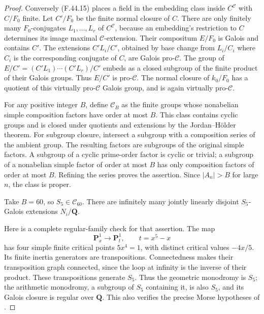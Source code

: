 \begin{proof}
Conversely \textup{(F.44.15)} places a field in the embedding class inside \(C^{\mathcal C}\) with \(C/F_0\) finite. Let \(C'/F_0\) be the finite normal closure of \(C\). There are only finitely many \(F_0\)-conjugates \(L_1,\ldots,L_r\) of \(C^{\mathcal C}\), because an embedding's restriction to \(C\) determines its image maximal \(\mathcal C\)-extension. Their compositum \(E/F_0\) is Galois and contains \(C'\). The extensions \(C'L_i/C'\), obtained by base change from \(L_i/C_i\) where \(C_i\) is the corresponding conjugate of \(C\), are Galois pro-\(\mathcal C\). The group of \(E/C'=(C'L_1)\cdots(C'L_r)/C'\) embeds as a closed subgroup of the finite product of their Galois groups. Thus \(E/C'\) is pro-\(\mathcal C\). The normal closure of \(k_0/F_0\) has a quotient of this virtually pro-\(\mathcal C\) Galois group, and is again virtually pro-\(\mathcal C\).


For any positive integer \(B\), define \(\mathcal C_B\) as the finite groups whose nonabelian simple composition factors have order at most \(B\). This class contains cyclic groups and is closed under quotients and extensions by the Jordan–Hölder theorem. For subgroup closure, intersect a subgroup with a composition series of the ambient group. The resulting factors are subgroups of the original simple factors. A subgroup of a cyclic prime-order factor is cyclic or trivial; a subgroup of a nonabelian simple factor of order at most \(B\) has only composition factors of order at most \(B\). Refining the series proves the assertion. Since \(|A_n|>B\) for large \(n\), the class is proper.

Take \(B=60\), so \(S_5\in\mathcal C_{60}\). There are infinitely many jointly linearly disjoint \(S_5\)-Galois extensions \(N_i/\mathbf Q\).

Here is a complete regular-family check for that assertion. The map
\[
                  \mathbf P^1_x\longrightarrow\mathbf P^1_t,
                         \qquad t=x^5-x
\]
has four simple finite critical points \(5x^4=1\), with distinct critical values \(-4x/5\). Its finite inertia generators are transpositions. Connectedness makes their transposition graph connected, since the loop at infinity is the inverse of their product. These transpositions generate \(S_5\). Thus the geometric monodromy is \(S_5\); the arithmetic monodromy, a subgroup of \(S_5\) containing it, is also \(S_5\), and its Galois closure is regular over \(\mathbf Q\). This also verifies the precise Morse hypotheses of \citet[Theorem~4.4.1, p.~39]{F_Serre2007}.


\end{proof}
